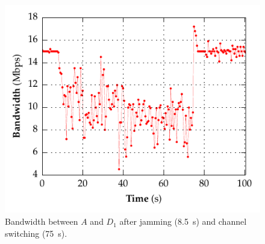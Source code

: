 \begin{figure}[t!]
  \centering
  \includegraphics[width=0.73\columnwidth]{./figures/ChannelBWGraph.pdf}
  \vspace*{-5mm}
  \caption{Bandwidth between $A$ and $D_1$ after jamming (8.5~s) and
  channel switching (75~s).}
  \label{fig:bw}
  \vspace*{-3mm}
\end{figure}
